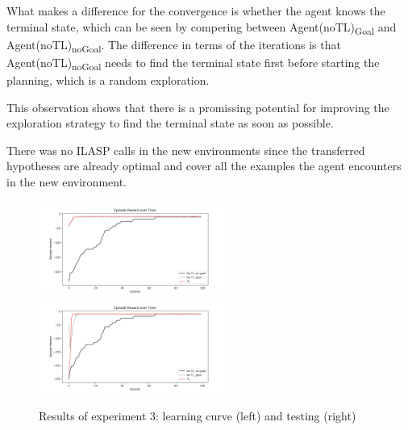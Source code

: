 What makes a difference for the convergence is whether the agent knows the terminal state, which can be seen by compering between Agent(noTL)\textsubscript{Goal} and Agent(noTL)\textsubscript{noGoal}.
The difference in terms of the iterations is that Agent(noTL)\textsubscript{noGoal} needs to find the terminal state first before starting the planning, which is a random exploration.

This observation shows that there is a promissing potential for improving the exploration strategy to find the terminal state as soon as possible.

There was no ILASP calls in the new environments since the transferred hypotheses are already optimal and cover all the examples the agent encounters in the new environment.

\begin{figure}[!htb]
\centerline{
\includegraphics[width=0.55\textwidth]{./figures/experiment3_after_training}
\includegraphics[width=0.55\textwidth]{./figures/experiment3_after_test}
}
\caption{Results of experiment 3: learning curve (left) and testing (right)}
\label{experiment3_training}
\end{figure}


